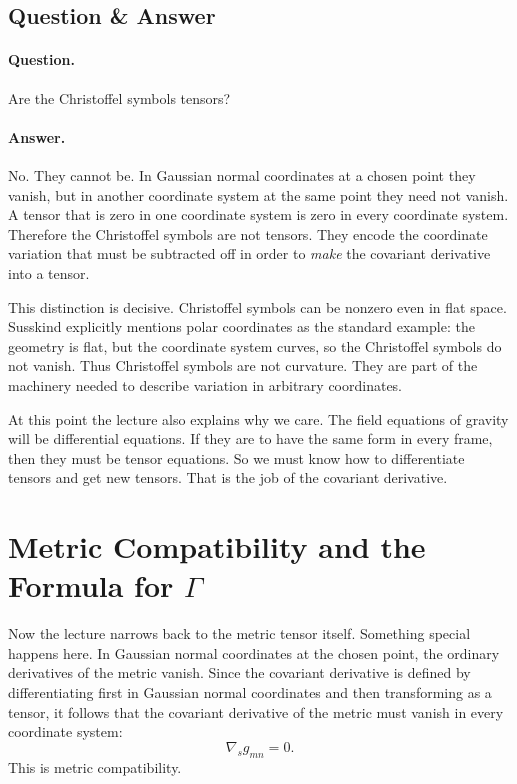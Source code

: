 \subsection{Question \& Answer}

\paragraph{Question.} Are the Christoffel symbols tensors?

\paragraph{Answer.} No. They cannot be. In Gaussian normal coordinates at a chosen point they vanish, but in another coordinate system at the same point they need not vanish. A tensor that is zero in one coordinate system is zero in every coordinate system. Therefore the Christoffel symbols are not tensors. They encode the coordinate variation that must be subtracted off in order to \emph{make} the covariant derivative into a tensor.

This distinction is decisive. Christoffel symbols can be nonzero even in flat space. Susskind explicitly mentions polar coordinates as the standard example: the geometry is flat, but the coordinate system curves, so the Christoffel symbols do not vanish. Thus Christoffel symbols are not curvature. They are part of the machinery needed to describe variation in arbitrary coordinates.

At this point the lecture also explains why we care. The field equations of gravity will be differential equations. If they are to have the same form in every frame, then they must be tensor equations. So we must know how to differentiate tensors and get new tensors. That is the job of the covariant derivative.

\section{Metric Compatibility and the Formula for \texorpdfstring{$\Gamma$}{Gamma}}

Now the lecture narrows back to the metric tensor itself. Something special happens here. In Gaussian normal coordinates at the chosen point, the ordinary derivatives of the metric vanish. Since the covariant derivative is defined by differentiating first in Gaussian normal coordinates and then transforming as a tensor, it follows that the covariant derivative of the metric must vanish in every coordinate system:
\begin{equation}
\nabla_s g_{mn}=0.
\end{equation}
This is metric compatibility.

